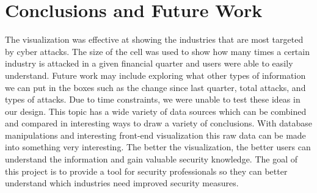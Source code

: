 \documentclass[journal]{vgtc}                %
\begin{document}
\section{Conclusions and Future Work}
The visualization was effective at showing the industries that are most targeted by cyber attacks. 
The size of the cell was used to show how many times a certain industry is attacked in a given financial quarter and users were able to easily understand.
Future work may include exploring what other types of information we can put in the boxes such as the change since last quarter, total attacks, and types of attacks. 
Due to time constraints, we were unable to test these ideas in our design.
This topic has a wide variety of data sources which can be combined and compared in interesting ways to draw a variety of conclusions.
With database manipulations and interesting front-end visualization this raw data can be made into something very interesting.
The better the visualization, the better users can understand the information and gain valuable security knowledge.
The goal of this project is to provide a tool for security professionals so they can better understand which industries need improved security measures. 

%

%
%
%


\end{document}
